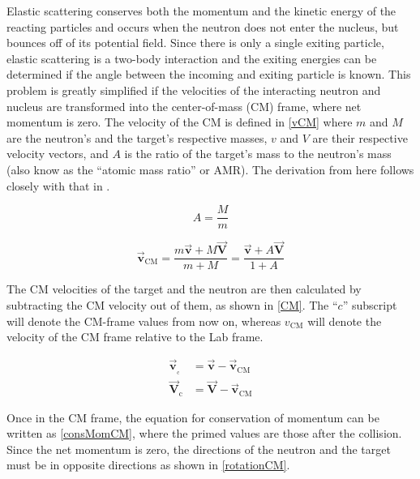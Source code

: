 Elastic scattering conserves both the momentum and the kinetic energy of the reacting particles and occurs when the neutron does not enter the nucleus, but bounces off of its potential field.  Since there is only a single exiting particle, elastic scattering is a two-body interaction and the exiting energies can be determined if the angle between the incoming and exiting particle is known.  This problem is greatly simplified if the velocities of the interacting neutron and nucleus are transformed into the center-of-mass (CM) frame, where net momentum is zero. The velocity of the CM is defined in \eqref{vCM} where $m$ and $M$ are the neutron's and the target's respective masses, $v$ and $V$ are their respective velocity vectors, and $A$ is the ratio of the target's mass to the neutron's mass (also know as the ``atomic mass ratio'' or AMR).  The derivation from here follows closely with that in \cite{jaakko}.

\begin{equation}
A = \frac{M}{m}
\label{AWR}
\end{equation}

\begin{equation}
\boldsymbol{\vec{v}_{\mathrm{CM}}} = \frac{ m \boldsymbol{\vec{v}} + M \boldsymbol{\vec{V}} }    {m+M} = \frac{ \boldsymbol{\vec{v}} + A \boldsymbol{\vec{V}} }    {1+A}
\label{vCM}
\end{equation}

The CM velocities of the target and the neutron are then calculated by subtracting the CM velocity out of them, as shown in \eqref{CM}.  The ``$c$'' subscript will denote the CM-frame values from now on, whereas $v_{\mathrm{CM}}$ will denote the velocity of the CM frame relative to the Lab frame.

\begin{equation}
\begin{split}
 \boldsymbol{\vec{v}_{_\mathrm{c}}} &= \boldsymbol{\vec{v}} - \boldsymbol{\vec{v}_{\mathrm{CM}}} \\  
 \boldsymbol{\vec{V}_{\mathrm{c}}} &= \boldsymbol{\vec{V}} - \boldsymbol{\vec{v}_{\mathrm{CM}}}
 \end{split}
\label{CM}
\end{equation}

Once in the CM frame, the equation for conservation of momentum can be written as \eqref{consMomCM}, where the primed values are those after the collision.  Since the net momentum is zero, the directions of the neutron and the target must be in opposite directions as shown in \eqref{rotationCM}.


